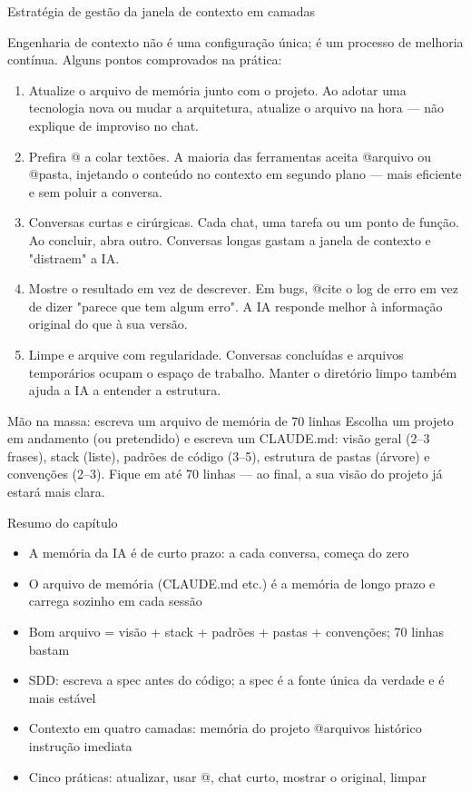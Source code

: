 \begin{center}\small\color{gray}Estratégia de gestão da janela de contexto em camadas\end{center}


Engenharia de contexto não é uma configuração única; é um processo de melhoria contínua. Alguns pontos comprovados na prática:

\begin{enumerate}
  \item Atualize o arquivo de memória junto com o projeto. Ao adotar uma tecnologia nova ou mudar a arquitetura, atualize o arquivo na hora — não explique de improviso no chat.
  \item Prefira @ a colar textões. A maioria das ferramentas aceita @arquivo ou @pasta, injetando o conteúdo no contexto em segundo plano — mais eficiente e sem poluir a conversa.
  \item Conversas curtas e cirúrgicas. Cada chat, uma tarefa ou um ponto de função. Ao concluir, abra outro. Conversas longas gastam a janela de contexto e "distraem" a IA.
  \item Mostre o resultado em vez de descrever. Em bugs, @cite o log de erro em vez de dizer "parece que tem algum erro". A IA responde melhor à informação original do que à sua versão.
  \item Limpe e arquive com regularidade. Conversas concluídas e arquivos temporários ocupam o espaço de trabalho. Manter o diretório limpo também ajuda a IA a entender a estrutura.
\end{enumerate}

\begin{tcbpractice}{Mão na massa: escreva um arquivo de memória de 70 linhas}
Escolha um projeto em andamento (ou pretendido) e escreva um CLAUDE.md: visão geral (2–3 frases), stack (liste), padrões de código (3–5), estrutura de pastas (árvore) e convenções (2–3). Fique em até 70 linhas — ao final, a sua visão do projeto já estará mais clara.

\end{tcbpractice}

\begin{tcbsummary}{Resumo do capítulo}
\begin{itemize}
  \item A memória da IA é de curto prazo: a cada conversa, começa do zero
  \item O arquivo de memória (CLAUDE.md etc.) é a memória de longo prazo e carrega sozinho em cada sessão
  \item Bom arquivo = visão + stack + padrões + pastas + convenções; 70 linhas bastam
  \item SDD: escreva a spec antes do código; a spec é a fonte única da verdade e é mais estável
  \item Contexto em quatro camadas: memória do projeto @arquivos histórico instrução imediata
  \item Cinco práticas: atualizar, usar @, chat curto, mostrar o original, limpar
\end{itemize}

\end{tcbsummary}
